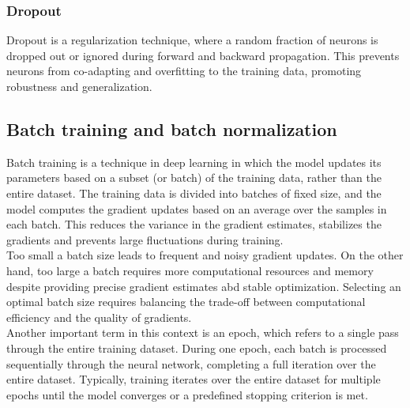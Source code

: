 \subsubsection{Dropout}
Dropout is a regularization technique, where a random fraction of neurons is dropped out or ignored during forward and backward propagation. This prevents neurons from co-adapting and overfitting to the training data, promoting robustness and generalization. 
\subsection{Batch training and batch normalization}
Batch training is a technique in deep learning in which the model updates its parameters based on a subset (or batch) of the training data, rather than the entire dataset. The training data is divided into batches of fixed size, and the model computes the gradient updates based on an average over the samples in each batch. This reduces the variance in the gradient estimates, stabilizes the gradients and prevents large fluctuations during training. \\
Too small a batch size leads to frequent and noisy gradient updates. On the other hand, too large a batch requires more computational resources and memory despite providing precise gradient estimates abd stable optimization. Selecting an optimal batch size requires balancing the trade-off between computational efficiency and the quality of gradients. \\                     
Another important term in this context is an epoch, which refers to a single pass through the entire training dataset. During one epoch, each batch is processed sequentially through the neural network, completing a full iteration over the entire dataset. Typically, training iterates over the entire dataset for multiple epochs until the model converges or a predefined stopping criterion is met. \\

